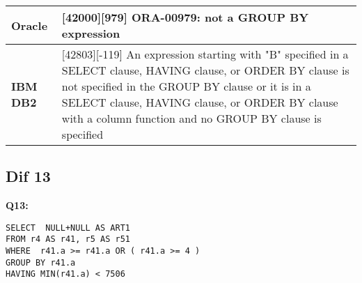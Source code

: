 \begin{table}[h]
\begin{tabular}{|p{2cm}|p{12cm}|}
\textbf{Oracle}                            & {[}42000{]}{[}979{]} ORA-00979: not a GROUP BY expression                                                                                                                                                                                                                               \\ \hline
\textbf{IBM DB2}                           & {[}42803{]}{[}-119{]} An expression starting with "B" specified in a SELECT clause, HAVING clause, or ORDER BY clause is not specified in the GROUP BY clause or it is in a SELECT clause, HAVING clause, or ORDER BY clause with a column function and no GROUP BY clause is specified \\ \hline
\end{tabular}
\end{table}


\subsection{Dif 13}
 
\begin{mdframed}[backgroundcolor=gray!20] 
\textbf{Q13:}
\begin{lstlisting}
SELECT  NULL+NULL AS ART1
FROM r4 AS r41, r5 AS r51
WHERE  r41.a >= r41.a OR ( r41.a >= 4 )
GROUP BY r41.a
HAVING MIN(r41.a) < 7506
\end{lstlisting}
\end{mdframed} 

